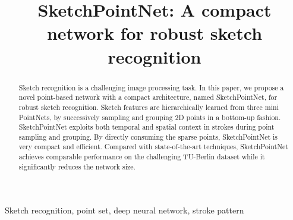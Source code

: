 \documentclass{article}
\title{SketchPointNet: A compact network for robust sketch recognition}
\begin{document}
%
\maketitle
%
\begin{abstract}
Sketch recognition is a challenging image processing task. In this paper, we propose a novel point-based network with a compact architecture, named SketchPointNet, for robust sketch recognition. Sketch features are hierarchically learned from three mini PointNets, by successively sampling and grouping 2D points in a bottom-up fashion. SketchPointNet exploits both temporal and spatial context in strokes during point sampling and grouping. 
By directly consuming the sparse points, SketchPointNet is very compact and efficient. Compared with state-of-the-art techniques, SketchPointNet achieves comparable performance on the challenging TU-Berlin dataset while it significantly reduces the network size.


\end{abstract}

\begin{keywords}
Sketch recognition, point set, deep neural network, stroke pattern
\end{keywords}







\end{document}
